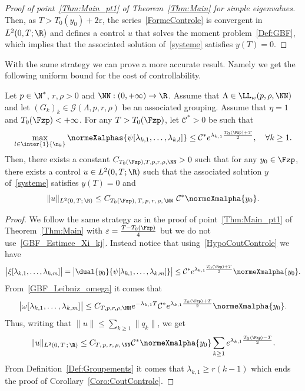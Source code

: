 \begin{proof}[Proof of point~\eqref{Thm:Main_pt1} of Theorem~\ref{Thm:Main} for simple eigenvalues]
Then, as $T>T_0(y_0) + 2 \varepsilon$, the series~\eqref{FormeControle} is convergent in $L^2(0,T ; \R)$ and defines a control $u$ that solves the moment problem~\eqref{Def:GBF}, which implies that the associated solution of~\eqref{systeme} satisfies $y(T)=0$.
\end{proof}



With the same strategy we can prove a more accurate result. Namely we get the following uniform bound for the cost of controllability.
\begin{coro} \label{Coro:CoutControle}
Let $p \in \N^*$, $r, \rho > 0$ and $\NN : (0,+\infty) \to \R$. Assume that $\Lambda \in \LL_w(p,\rho, \NN)$ and let $(G_k)_k\in \mathcal{G}(\Lambda,p,r,\rho)$ be an associated grouping. Assume that $\eta=1$ and $T_0(\Fzp) < +\infty$. For any $T>T_0(\Fzp)$, let $\mathcal{C}^*>0 $ be such that
\begin{equation}\label{HypoCoutControle}
\max_{l \in \inter{1}{\n_k}} \normeXalphas{\psi[\lambda_{k,1}, \dots, \lambda_{k,l}]} \leq \mathcal{C}^* e^{\lambda_{k,1} \frac{T_0(\Fzp)+T}{2}}, \quad \forall k \geq 1.
\end{equation}
Then, there exists a constant $C_{T_0(\Fzp),T,p,r,\rho, \NN}>0$ such that for any $y_0 \in \Fzp$, there exists a control $u \in L^2(0,T ; \R)$ such that the associated solution $y$ of~\eqref{systeme} satisfies $y(T) = 0$ and
\[
\| u \|_{L^2(0,\,T;\,\R)} \leq C_{T_0(\Fzp),\,T,\,p,\,r,\,\rho,\,\NN}\ \mathcal{C}^* \normeXmalpha{ y_0 }.
\]
\end{coro}

\begin{proof}
We follow the same strategy as in the proof of point~\eqref{Thm:Main_pt1} of Theorem~\ref{Thm:Main} with $\varepsilon = \frac{T-T_0(\Fzp)}{4}$ but we do not use~\eqref{GBF_Estimee_Xi_kj}. Instead notice that using~\eqref{HypoCoutControle} we have
\[
\big| \xi[\lambda_{k,1}, \dots, \lambda_{k,m}] \big| = \big| \dual{ y_0}{ \psi[\lambda_{k,1}, \dots, \lambda_{k,m}]} \big|
\leq \mathcal{C}^* e^{\lambda_{k,1} \frac{T_0(\Fzp)+T}{2}} \normeXmalpha{ y_0 }.
\]
From~\eqref{GBF_Leibniz_omega} it comes that
\[
\big| \omega[\lambda_{k,1}, \dots, \lambda_{k,m}] \big| \leq C_{T,p,r,\rho,\NN} e^{-\lambda_{k,1} T} \mathcal{C}^* e^{\lambda_{k,1} \frac{T_0(\Fzp)+T}{2}} \normeXmalpha{ y_0}.
\]
Thus, writing that $\|u\|\leq \sum_{k\geq 1} \|q_k\|$, we get
\begin{equation*}
\| u \|_{L^2(0,\,T\,;\,\R)}
\leq C_{T,\,p,\,r,\,\rho,\,\NN} \mathcal{C}^* \normeXmalpha{ y_0 } \sum_{k \geq 1} e^{\lambda_{k,1} \frac{T_0(\Fzp)-T}{2}}.
\end{equation*}
From Definition~\ref{Def:Groupements} it comes that $\lambda_{k,1} \geq r (k-1)$ which ends the proof of Corollary~\ref{Coro:CoutControle}.
\end{proof}



